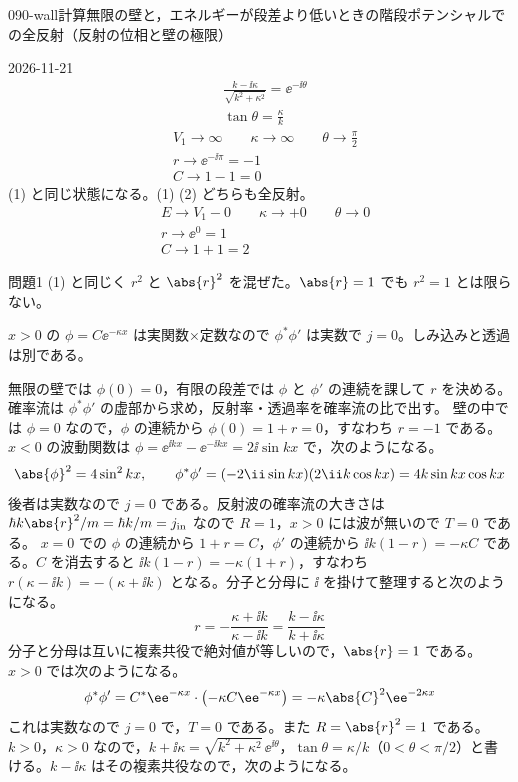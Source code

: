 \documentclass[uplatex,dvipdfmx,a4paper,11pt]{jsarticle}
\begin{document}
\begin{mondai}{090-wall}{計算}{無限の壁と，エネルギーが段差より低いときの階段ポテンシャルでの全反射（反射の位相と壁の極限）}
\begin{kotaeutsushi}{2026-11-21}
\begin{align*}
&\frac{k-\ii\kappa}{\sqrt{k^{2}+\kappa^{2}}}=\ee^{-\ii\theta}\\
&\tan\theta=\frac{\kappa}{k}
\end{align*}
\begin{align*}
&V_{1}\to\infty\qquad\kappa\to\infty\qquad\theta\to\frac{\pi}{2}\\
&r\to\ee^{-\ii\pi}=-1\\
&C\to1-1=0
\end{align*}
(1) と同じ状態になる。(1) (2) どちらも全反射。
\begin{align*}
&E\to V_{1}-0\qquad\kappa\to+0\qquad\theta\to0\\
&r\to\ee^{0}=1\\
&C\to1+1=2
\end{align*}
\end{kotaeutsushi}
\begin{kizuki}
\item {} 問題1 (1) と同じく $r^{2}$ と $\abs{r}^{2}$ を混ぜた。$\abs{r}=1$ でも $r^{2}=1$ とは限らない。
\item $x>0$ の $\phi=C\ee^{-\kappa x}$ は実関数×定数なので $\phi^{*}\phi'$ は実数で $j=0$。しみ込みと透過は別である。
\end{kizuki}
\begin{tadashii}
\houshin 無限の壁では $\phi(0)=0$，有限の段差では $\phi$ と $\phi'$ の連続を課して $r$ を決める。確率流は $\phi^{*}\phi'$ の虚部から求め，反射率・透過率を確率流の比で出す。
\keisan
{} 壁の中では $\phi=0$ なので，$\phi$ の連続から $\phi(0)=1+r=0$，すなわち $r=-1$ である。$x<0$ の波動関数は $\phi=\ee^{\ii kx}-\ee^{-\ii kx}=2\ii\sin kx$ で，次のようになる。
\[ \abs{\phi}^{2}=4\sin^{2}kx,\qquad \phi^{*}\phi'=(-2\ii\sin kx)(2\ii k\cos kx)=4k\sin kx\cos kx \]
後者は実数なので $j=0$ である。反射波の確率流の大きさは $\hbar k\abs{r}^{2}/m=\hbar k/m=j_{\mathrm{in}}$ なので $R=1$，$x>0$ には波が無いので $T=0$ である。
 $x=0$ での $\phi$ の連続から $1+r=C$，$\phi'$ の連続から $\ii k(1-r)=-\kappa C$ である。$C$ を消去すると $\ii k(1-r)=-\kappa(1+r)$，すなわち $r(\kappa-\ii k)=-(\kappa+\ii k)$ となる。分子と分母に $\ii$ を掛けて整理すると次のようになる。
\[ r=-\frac{\kappa+\ii k}{\kappa-\ii k}=\frac{k-\ii\kappa}{k+\ii\kappa} \]
分子と分母は互いに複素共役で絶対値が等しいので，$\abs{r}=1$ である。$x>0$ では次のようになる。
\[ \phi^{*}\phi'=C^{*}\ee^{-\kappa x}\cdot\left(-\kappa C\ee^{-\kappa x}\right)=-\kappa\abs{C}^{2}\ee^{-2\kappa x} \]
これは実数なので $j=0$ で，$T=0$ である。また $R=\abs{r}^{2}=1$ である。
 $k>0$，$\kappa>0$ なので，$k+\ii\kappa=\sqrt{k^{2}+\kappa^{2}}\,\ee^{\ii\theta}$，$\tan\theta=\kappa/k$（$0<\theta<\pi/2$）と書ける。$k-\ii\kappa$ はその複素共役なので，次のようになる。

\end{tadashii}
\end{mondai}
\end{document}
